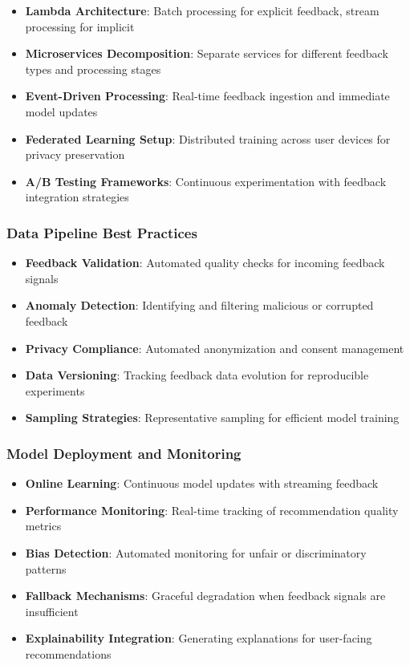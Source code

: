 \documentclass[acmsmall,review,anonymous]{acmart}
\begin{document}
\begin{itemize}
    \item \textbf{Lambda Architecture}: Batch processing for explicit feedback, stream processing for implicit
    \item \textbf{Microservices Decomposition}: Separate services for different feedback types and processing stages
    \item \textbf{Event-Driven Processing}: Real-time feedback ingestion and immediate model updates
    \item \textbf{Federated Learning Setup}: Distributed training across user devices for privacy preservation
    \item \textbf{A/B Testing Frameworks}: Continuous experimentation with feedback integration strategies
\end{itemize}

\subsubsection{Data Pipeline Best Practices}

\begin{itemize}
    \item \textbf{Feedback Validation}: Automated quality checks for incoming feedback signals
    \item \textbf{Anomaly Detection}: Identifying and filtering malicious or corrupted feedback
    \item \textbf{Privacy Compliance}: Automated anonymization and consent management
    \item \textbf{Data Versioning}: Tracking feedback data evolution for reproducible experiments
    \item \textbf{Sampling Strategies}: Representative sampling for efficient model training
\end{itemize}

\subsubsection{Model Deployment and Monitoring}

\begin{itemize}
    \item \textbf{Online Learning}: Continuous model updates with streaming feedback
    \item \textbf{Performance Monitoring}: Real-time tracking of recommendation quality metrics
    \item \textbf{Bias Detection}: Automated monitoring for unfair or discriminatory patterns
    \item \textbf{Fallback Mechanisms}: Graceful degradation when feedback signals are insufficient
    \item \textbf{Explainability Integration}: Generating explanations for user-facing recommendations
\end{itemize}
\end{document}
